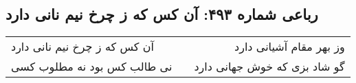 \begin{center}
\section*{رباعی شماره ۴۹۳: آن کس که ز چرخ نیم نانی دارد}
\label{sec:0493}
\begin{longtable}{l p{0.5cm} r}
آن کس که ز چرخ نیم نانی دارد
&&
وز بهر مقام آشیانی دارد
\\
نی طالب کس بود نه مطلوب کسی
&&
گو شاد بزی که خوش جهانی دارد
\\
\end{longtable}
\end{center}
